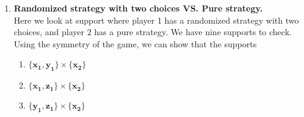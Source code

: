 \begin{enumerate} [label=\Alph*. ]
\begin{enumerate} [label*= (\arabic*)]
    \item $\mathbf{\{y_1\}} \times \mathbf{\{y_2, z_2\}}$. \\
        In Step 2, for player 2, we have
        \begin{equation*}
            w_2 = u_2 \parent{y_1, d_2} \ \forall \ d_2 \in \bracket{y_2, z_2}.
        \end{equation*}
        Hence we must have 0 = 4, therefore, this support does not give an equilibrium.
        
    \item $\mathbf{\{z_1\}} \times \mathbf{\{x_2, y_2\}}$. \\
        In Step 2, for player 2, we have
        \begin{equation*}
            w_2 = u_2 \parent{z_1, d_2} \ \forall \ d_2 \in \bracket{x_2, y_2}.
        \end{equation*}
        Hence we must have 4 = 5, therefore, this support does not give an equilibrium.
        
    \item $\mathbf{\{z_1\}} \times \mathbf{\{x_2, z_2\}}$. \\
        In Step 2, for player 2, we have
        \begin{equation*}
            w_2 = u_2 \parent{z_1, d_2} \ \forall \ d_2 \in \bracket{x_2, z_2}.
        \end{equation*}
        Hence we must have 4 = 0, therefore, this support does not give an equilibrium.
        
    \item $\mathbf{\{z_1\}} \times \mathbf{\{y_2, z_2\}}$. \\
        In Step 2, for player 2, we have
        \begin{equation*}
            w_2 = u_2 \parent{z_1, d_2} \ \forall \ d_2 \in \bracket{y_2, z_2}.
        \end{equation*}
        Hence we must have 5 = 0, therefore, this support does not give an equilibrium.
\end{enumerate}



\item \textbf{Randomized strategy with two choices VS. Pure strategy.} \\
Here we look at support where player 1 has a randomized strategy with two choices, and player 2 has a pure strategy. We have nine supports to check. Using the symmetry of the game, we can show that the supports
\begin{enumerate} [label*= (\arabic*)]
    \item $\mathbf{\{x_1, y_1\}} \times \mathbf{\{x_2\}}$
    \item $\mathbf{\{x_1, z_1\}} \times \mathbf{\{x_2\}}$
    \item $\mathbf{\{y_1, z_1\}} \times \mathbf{\{x_2\}}$
    

\end{enumerate}
\end{enumerate}
